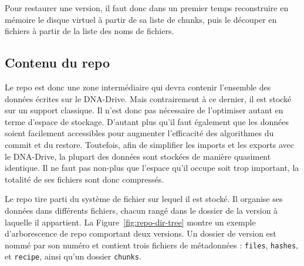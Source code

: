 \documentclass[a4paper]{report}
\begin{document}
Pour restaurer une version, il faut donc dans un premier temps
reconstruire en mémoire le disque virtuel à partir de sa liste de chunks,
puis le découper en fichiers à partir de la liste des noms de fichiers.


\subsection{Contenu du repo}

Le repo est donc une zone intermédiaire qui devra contenir l'ensemble des données écrites sur le DNA-Drive.
Mais contrairement à ce dernier, il est stocké sur un support classique.
Il n'est donc pas nécessaire de l'optimiser autant en terme d'espace de stockage.
D'autant plus qu'il faut également que les données soient facilement accessibles
pour augmenter l'efficacité des algorithmes du commit et du restore.
Toutefois, afin de simplifier les imports et les exports avec le DNA-Drive,
la plupart des données sont stockées de manière quasiment identique.
Il ne faut pas non-plus que l'espace qu'il occupe soit trop important,
la totalité de ses fichiers sont donc compressés.

Le repo tire parti du système de fichier sur lequel il est stocké.
Il organise ses données dans différents fichiers,
chacun rangé dans le dossier de la version à laquelle il appartient.
La Figure~\ref{fig:repo-dir-tree} montre un exemple d'arborescence de repo comportant deux versions.
Un dossier de version est nommé par son numéro et contient trois fichiers de métadonnées :
\verb|files|, \verb|hashes|, et \verb|recipe|, ainsi qu'un dossier \verb|chunks|.
\end{document}

